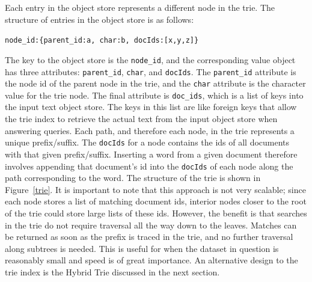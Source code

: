 \documentclass{vldb}
\begin{document}
Each entry in the object store represents a different node in the trie. The structure of entries in the object store is as follows:
\begin{center}
\texttt{node\_id:\{parent\_id:a, char:b, docIds:[x,y,z]\}}
\end{center}
The key to the object store is the \texttt{node\_id}, and the corresponding value object has three attributes: \texttt{parent\_id}, \texttt{char}, and \texttt{docIds}. The \texttt{parent\_id} attribute is the node id of the parent node in the trie, and the \texttt{char} attribute is the character value for the trie node. The final attribute is \texttt{doc\_ids}, which is a list of keys into the input text object store. The keys in this list are like foreign keys that allow the trie index to retrieve the actual text from the input object store when answering queries. Each path, and therefore each node, in the trie represents a unique prefix/suffix. The \texttt{docIds} for a node contains the ids of all documents with that given prefix/suffix. Inserting a word from a given document therefore involves appending that document's id into the \texttt{docIds} of each node along the path corresponding to the word. The structure of the trie is shown in Figure~\ref{trie}.  It is important to note that this approach is not very scalable; since each node stores a list of matching document ids, interior nodes closer to the root of the trie could store large lists of these ids. However, the benefit is that searches in the trie do not require traversal all the way down to the leaves. Matches can be returned as soon as the prefix is traced in the trie, and no further traversal along subtrees is needed. This is useful for when the dataset in question is reasonably small and speed is of great importance. An alternative design to the trie index is the Hybrid Trie discussed in the next section.
\end{document}
